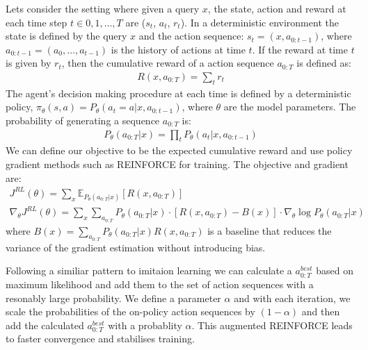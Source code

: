 Lets consider the setting where given a query $x$, the state, action and reward at each time step $t \in {0, 1, \dots, T }$ are ($s_t$, $a_t$, $r_t$). In a deterministic environment the state is defined by the query $x$ and the action sequence: $s_t = (x, a_{0:t-1})$, where $a_{0:t-1} = (a_0, \dots, a_{t-1})$ is the history of actions at time $t$. If the reward at time $t$ is given by $r_t$, then the cumulative reward of a action sequence $a_{0:T}$ is defined as:
\begin{gather}
R(x, a_{0:T}) = \sum_{t}r_t
\end{gather}
The agent’s decision making procedure at each time is defined by a deterministic policy, $\pi_\theta(s,a) = P_\theta(a_t = a|x, a_{0:t-1})$, where $\theta$ are the model parameters. The probability of generating a sequence $a_{0:T}$ is:
\begin{gather}
P_\theta(a_{0:T}|x) = \prod_{t}P_\theta(a_t|x, a_{0:t-1})
\end{gather}
We can define our objective to be the expected cumulative reward and use policy gradient methods such as REINFORCE for training. The objective and gradient are:
\begin{gather}
J^{RL}(\theta) = \sum_{x}\mathbb{E}_{P_\theta(a_{0:T}|x)}[R(x, a_{0:T})] \\
\nabla_\theta J^{RL}(\theta) = \sum_{x}\sum_{a_{0:T}}P_\theta(a_{0:T}|x)\cdot[R(x, a_{0:T}) - B(x)]\cdot\nabla_\theta \log P_\theta(a_{0:T}|x)
\end{gather}
where $B(x) = \sum\nolimits_{a_{0:T}} P_\theta(a_{0:T} | x)R(x, a_{0:T})$ is a baseline that reduces the variance of the gradient estimation without introducing bias.

Following a similiar pattern to imitaion learning \cite{ross2011reduction, berant2015imitation} we can calculate a $a^{best}_{0:T}$ based on maximum likelihood and add them to the set of action sequences with a resonably large probability. We define a parameter $\alpha$ and with each iteration, we scale the probabilities of the on-policy action sequences by $(1 - \alpha)$ and then add the calculated $a^{best}_{0:T}$ with a probablity $\alpha$. This augmented REINFORCE leads to faster convergence and stabilises training.